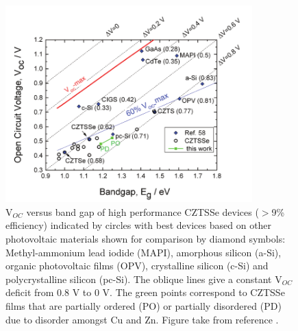 \begin{figure}[h!]
  \centering
    \includegraphics[width=0.85\textwidth]{figures/Voc.png}
    \caption{V$_{OC}$ versus band gap of high performance CZTSSe devices ($>$9\% efficiency) indicated by circles with best devices based on other photovoltaic materials shown for comparison by diamond symbols: Methyl-ammonium lead iodide (MAPI), amorphous silicon (a-Si), organic photovoltaic films (OPV), crystalline silicon (c-Si) and polycrystalline silicon (pc-Si). The oblique lines give a constant V$_{OC}$ deficit from 0.8 V to 0 V. The green points correspond to CZTSSe films that are partially ordered (PO) or partially disordered (PD) due to disorder amongst Cu and Zn. Figure take from reference .}
  \label{Voc}
\end{figure}

